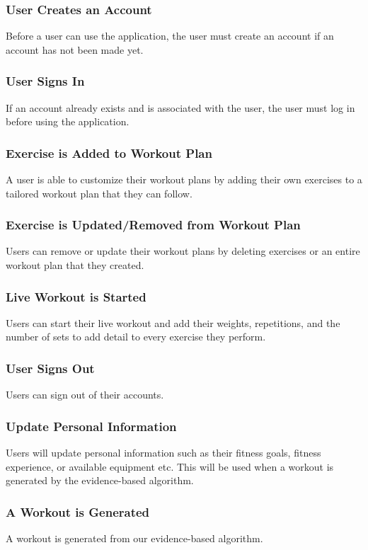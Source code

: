 \documentclass[12pt]{article}
\begin{document}
\subsubsection{User Creates an Account}
Before a user can use the application, the user must create an account if an account has not been made yet.

\subsubsection{User Signs In}
If an account already exists and is associated with the user, the user must log in before using the application.

\subsubsection{Exercise is Added to Workout Plan}
A user is able to customize their workout plans by adding their own exercises to a tailored workout plan that they can follow.

\subsubsection{Exercise is Updated/Removed from Workout Plan}
Users can remove or update their workout plans by deleting exercises or an entire workout plan that they created.

\subsubsection{Live Workout is Started}
Users can start their live workout and add their weights, repetitions, and the number of sets to add detail to every exercise they perform.

\subsubsection{User Signs Out}
Users can sign out of their accounts.

\subsubsection{Update Personal Information}
Users will update personal information such as their fitness goals, fitness experience, or available equipment etc. This will be used when a workout is generated by the evidence-based algorithm.

\subsubsection{A Workout is Generated}
A workout is generated from our evidence-based algorithm.
\end{document}
